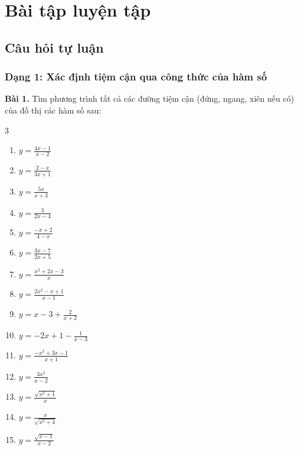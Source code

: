 \documentclass[12pt]{article}
\begin{document}
	\newpage
	
	\section{Bài tập luyện tập}
	
	\subsection{Câu hỏi tự luận}
	
	\subsubsection{Dạng 1: Xác định tiệm cận qua công thức của hàm số}
	
	\begin{btxanh}
		\noindent \textbf{Bài 1.} Tìm phương trình tất cả các đường tiệm cận (đứng, ngang, xiên nếu có) của đồ thị các hàm số sau:
		\begin{multicols}{3}
			\begin{enumerate}[label=\textbf{\arabic*)}]
				\item $y = \frac{4x - 1}{x - 2}$
				\item $y = \frac{2 - x}{3x + 1}$
				\item $y = \frac{5x}{x + 3}$
				\item $y = \frac{3}{2x - 4}$
				\item $y = \frac{-x + 2}{4 - x}$
				\item $y = \frac{3x - 7}{2x + 5}$
				\item $y = \frac{x^2 + 2x - 3}{x}$
				\item $y = \frac{2x^2 - x + 1}{x - 1}$
				\item $y = x - 3 + \frac{2}{x + 2}$
				\item $y = -2x + 1 - \frac{1}{x - 3}$
				\item $y = \frac{-x^2 + 3x - 1}{x + 1}$
				\item $y = \frac{3x^2}{x - 2}$
				\item $y = \frac{\sqrt{x^2 + 1}}{x}$
				\item $y = \frac{x}{\sqrt{x^2 + 4}}$
				\item $y = \frac{\sqrt{x - 1}}{x - 2}$
			\end{enumerate}
		\end{multicols}
	\end{btxanh}
	
	\vspace{0.8cm}
	
\end{document}
